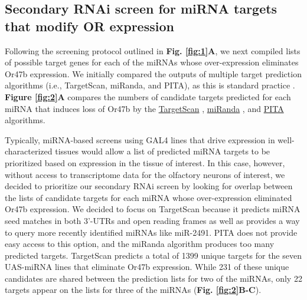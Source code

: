 \subsection*{Secondary RNAi screen for miRNA targets that modify OR expression}

Following the screening protocol outlined in \textbf{Fig. \ref{fig:1}A}, we next compiled lists of possible target genes for each of the miRNAs whose over-expression eliminates Or47b expression.
We initially compared the outputs of multiple target prediction algorithms (i.e., TargetScan, miRanda, and PITA), as this is standard practice \cite{am_Namkoong_Lee_Chung_Kim_2009,agen_Okamura_Perrimon_Lai_2007}.
\textbf{Figure \ref{fig:2}A} compares the numbers of candidate targets predicted for each miRNA that induces loss of Or47b by the \href{http://www.targetscan.org/fly_12/}{TargetScan} \cite{ohnston_Kellis_Bartel_Lai_2007}, \href{http://www.microrna.org}{miRanda} \cite{Gaul_Tuschl_Sander_Marks_2003}, and \href{http://genie.weizmann.ac.il/pubs/mir07/mir07_dyn_data.html}{PITA} \cite{ino_Unnerstall_Gaul_Segal_2007} algorithms.

Typically, miRNA-based screens using GAL4 lines that drive expression in well-characterized tissues would allow a list of predicted miRNA targets to be prioritized based on expression in the tissue of interest.
In this case, however, without access to transcriptome data for the olfactory neurons of interest, we decided to prioritize our secondary RNAi screen by looking for overlap between the lists of candidate targets for each miRNA whose over-expression eliminated Or47b expression.
We decided to focus on TargetScan because it predicts miRNA seed matches in both 3'-UTRs and open reading frames as well as provides a way to query more recently identified miRNAs like miR-2491.
PITA does not provide easy access to this option, and the miRanda algorithm produces too many predicted targets.
TargetScan predicts a total of 1399 unique targets for the seven UAS-miRNA lines that eliminate Or47b expression.
While 231 of these unique candidates are shared between the prediction lists for two of the miRNAs, only 22 targets appear on the lists for three of the miRNAs (\textbf{Fig. \ref{fig:2}B-C}).

